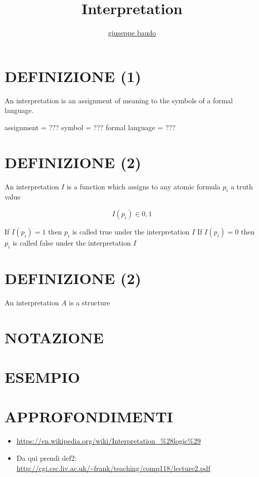 \documentclass[a4paper,10pt]{article}
\title{Interpretation}
\author{\href{http://www.baudo.hol.es}{giuseppe baudo}}
\begin{document}
\maketitle

\section{DEFINIZIONE (1)}
An interpretation is an assignment of meaning to the symbols of a formal language.  

assignment = ???  
symbol = ???  
formal language = ???

\section{DEFINIZIONE (2)}
An interpretation $I$ is a function which assigns to any atomic formula $p_i$ a truth value

\[
I(p_i) \in {0,1}
\]

If $I(p_i)=1$ then $p_i$ is called true under the interpretation $I$  
If $I(p_i)=0$ then $p_i$ is called false under the interpretation $I$

\section{DEFINIZIONE (2)}
An interpretation $A$ is a structure

\section{NOTAZIONE}

\section{ESEMPIO}

\section{APPROFONDIMENTI}
\begin{itemize}
 \item \url{https://en.wikipedia.org/wiki/Interpretation_%28logic%29}
 \item Da qui prendi def2: \url{http://cgi.csc.liv.ac.uk/~frank/teaching/comp118/lecture2.pdf}
\end{itemize}
\end{document}
